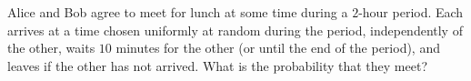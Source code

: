 Alice and Bob agree to meet for lunch at some time during a $2$-hour period. Each arrives at a time chosen uniformly at random during the period, independently of the other, waits $10$ minutes for the other (or until the end of the period), and leaves if the other has not arrived. What is the probability that they meet?
